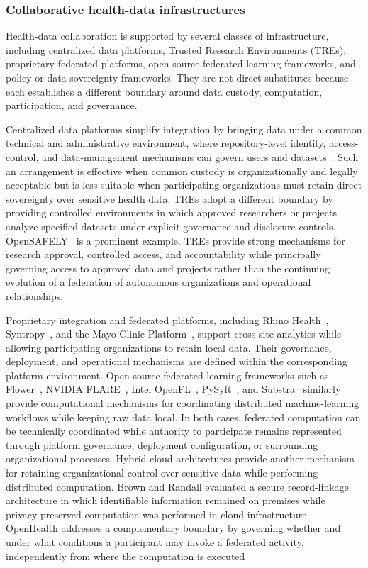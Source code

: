 \documentclass[twoside,11pt]{article}
\begin{document}
\subsubsection{Collaborative health-data infrastructures}
Health-data collaboration is supported by several classes of infrastructure, including centralized data platforms, Trusted Research Environments (TREs), proprietary federated platforms, open-source federated learning frameworks, and policy or data-sovereignty frameworks. They are not direct substitutes because each establishes a different boundary around data custody, computation, participation, and governance.

Centralized data platforms simplify integration by bringing data under a common technical and administrative environment, where repository-level identity, access-control, and data-management mechanisms can govern users and datasets~\cite{Hai_2023, Runyon_2022}. Such an arrangement is effective when common custody is organizationally and legally acceptable but is less suitable when participating organizations must retain direct sovereignty over sensitive health data. TREs adopt a different boundary by providing controlled environments in which approved researchers or projects analyze specified datasets under explicit governance and disclosure controls. OpenSAFELY~\cite{OpenSAFELY} is a prominent example. TREs   provide strong mechanisms for research approval, controlled access, and accountability while principally governing access to approved data and projects rather than the continuing evolution of a federation of autonomous organizations and operational relationships.

Proprietary integration and federated platforms, including Rhino Health~\cite{RhinoHealth}, Syntropy~\cite{Syntropy}, and the Mayo Clinic Platform~\cite{MayoClinicPlatform}, support cross-site analytics while allowing participating organizations to retain local data. Their governance, deployment, and operational mechanisms are defined within the corresponding platform environment. Open-source federated learning frameworks such as Flower~\cite{Beutel_2020}, NVIDIA FLARE~\cite{NVIDIA_FLARE}, Intel OpenFL~\cite{Intel_OpenFL}, PySyft~\cite{OpenMined_PySyft}, and Substra~\cite{Galtier_2019} similarly provide computational mechanisms for coordinating distributed machine-learning workflows while keeping raw data local. In both cases, federated computation can be technically coordinated while authority to participate remains represented through platform governance, deployment configuration, or surrounding organizational processes. Hybrid cloud architectures provide another mechanism for retaining organizational control over sensitive data while performing distributed computation. Brown and Randall evaluated a secure record-linkage architecture in which identifiable information remained on premises while privacy-preserved computation was performed in cloud infrastructure~\cite{Brown_2020}. OpenHealth addresses a complementary boundary by governing whether and under what conditions a participant may invoke a federated activity, independently from where the computation is executed
\end{document}

